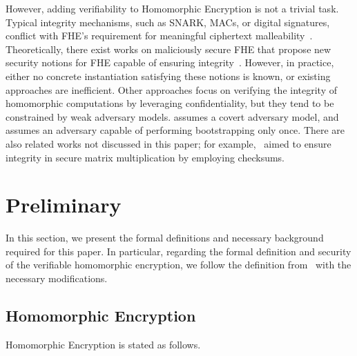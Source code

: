 \documentclass[runningheads]{llncs}
\begin{document}
    However, adding verifiability to Homomorphic Encryption is not a trivial task.  
    Typical integrity mechanisms, such as SNARK, MACs, or digital signatures, conflict with FHE’s requirement for meaningful ciphertext malleability~\cite{SnarkVHE, Flexible, Efficiently, BoostingVCE, Rinocchio}. Theoretically, there exist works on maliciously secure FHE that propose new security notions for FHE capable of ensuring integrity~\cite{Beyond_IND-CCA1_Security, Targeted_Malleability}.  
    However, in practice, either no concrete instantiation satisfying these notions is known, or existing approaches are inefficient.
    Other approaches focus on verifying the integrity of homomorphic computations by leveraging confidentiality, but they tend to be constrained by weak adversary models. \cite{VE} assumes a covert adversary model, and~\cite{cryptoeprint:PRF} assumes an adversary capable of performing bootstrapping only once. There are also related works not discussed in this paper; for example,~\cite{DataSeal} aimed to ensure integrity in secure matrix multiplication by employing checksums.
    

\section{Preliminary} \label{sec 2: Preliminary}
In this section, we present the formal definitions and necessary background required for this paper. In particular, regarding the formal definition and security of the verifiable homomorphic encryption, we follow the definition from~\cite{vFHE} with the necessary modifications.
    \subsection{Homomorphic Encryption}
    Homomorphic Encryption is stated as follows.
    
\end{document}
